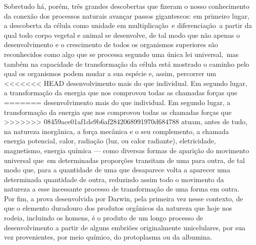Sobretudo há, porém, três grandes descobertas que fizeram o nosso
conhecimento da conexão dos processos naturais avançar passos
gigantescos: em primeiro lugar, a descoberta da célula como unidade em
multiplicação \textbar{}\,e diferenciação\,\textbar{} a partir da qual todo corpo vegetal
e animal se desenvolve, de tal modo que não apenas o desenvolvimento e
o crescimento de todos os organismos superiores são reconhecidos como
algo que se processa segundo uma única lei universal, \textbar{}\,mas também na
capacidade de transformação da célula está mostrado o caminho pelo qual
os organismos podem mudar a sua espécie e, assim, percorrer um
<<<<<<< HEAD
desenvolvimento mais do que individual. Em segundo lugar,\,\textbar{} a
transformação da energia que nos comprovou todas as chamadas forças que %
=======
desenvolvimento mais do que individual. Em segundo lugar, \textbar{} a
transformação da energia que nos comprovou todas as chamadas forças que %
>>>>>>> 08459ace01af1de9b6af2842068991970d684788
atuam, antes de tudo, na natureza inorgânica, a força mecânica e o seu
complemento, a chamada energia potencial, calor, radiação (luz, ou calor
radiante), eletricidade, magnetismo, energia química --- como diversas
formas de aparição do movimento universal que\est\ em determinadas
proporções transitam 
de uma para outra, de tal modo que, para a quantidade de uma que
desaparece volta a aparecer uma determinada quantidade de outra,
reduzindo assim todo o movimento da natureza a esse incessante processo
de transformação de uma forma em outra. Por fim, a prova desenvolvida por Darwin,
pela primeira vez nesse contexto,
de que o elemento duradouro dos produtos orgânicos da 
natureza que hoje nos rodeia, incluindo os homens, é o produto de um
longo processo de desenvolvimento a partir de alguns embriões
originalmente unicelulares, por sua vez provenientes, por meio químico, do protoplasma ou da albumina.

